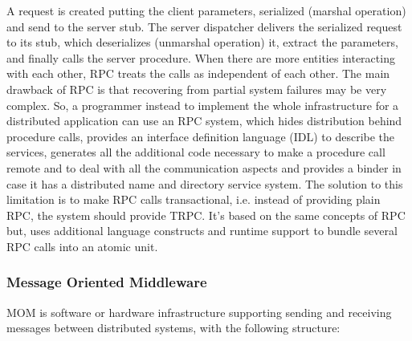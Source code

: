 A request is created putting the client parameters, serialized (marshal operation) and send to the server stub. The server dispatcher delivers the serialized request to its stub, which deserializes (unmarshal operation) it, extract the parameters, and finally calls the server procedure.
When there are more entities interacting with each other, RPC treats the calls as independent of each other.
The main drawback of RPC is that recovering from partial system failures may be very complex.
So, a programmer instead to implement the whole infrastructure for a distributed application can use an RPC system, which hides distribution behind procedure calls, provides an interface definition language (IDL) to describe the services, generates all the additional code necessary to make a procedure call remote and to deal with all the communication aspects and provides a binder in case it has a distributed name and directory service system.
The solution to this limitation is to make RPC calls transactional, i.e. instead of providing plain RPC, the system should provide TRPC.
It's based on the same concepts of RPC but, uses additional language constructs and runtime support to bundle several RPC calls into an atomic unit.

\subsubsection{Message Oriented Middleware}
MOM is software or hardware infrastructure supporting sending and receiving messages between distributed systems, with the following structure:

